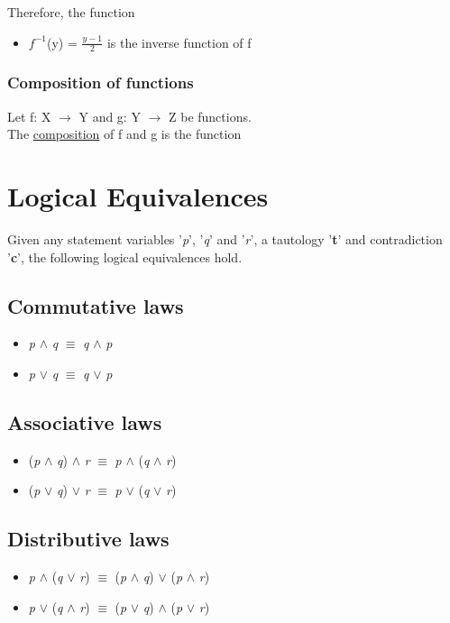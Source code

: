 \documentclass{article}
\begin{document}
Therefore, the function
\begin{itemize}
\item $f^{-1}$(y) = $\frac{y-1}{2}$ is the inverse function of f
\end{itemize}

\subsubsection{Composition of functions}

Let f: X $\longrightarrow$ Y and g: Y $\longrightarrow$ Z be functions. \\

The \underline{composition} of f and g is the function

\section{Logical Equivalences}

Given any statement variables '\textit{p}', '\textit{q}' and '\textit{r}', a tautology '\textbf{t}' and contradiction '\textbf{c}', the following
logical equivalences hold.


\subsection{Commutative laws}
\begin{itemize} 
\item \textit{p} $\wedge$ \textit{q} $\equiv$ \textit{q} $\wedge$ \textit{p}
\item \textit{p} $\lor$ \textit{q} $\equiv$ \textit{q} $\lor$ \textit{p}
\end{itemize}

\subsection{Associative laws}
\begin{itemize}
\item (\textit{p} $\wedge$ \textit{q}) $\wedge$ \textit{r} $\equiv$ \textit{p} $\wedge$ (\textit{q} $\wedge$ \textit{r})
\item (\textit{p} $\lor$ \textit{q}) $\lor$ \textit{r} $\equiv$ \textit{p} $\lor$ (\textit{q} $\lor$ \textit{r})
\end{itemize}

\subsection{Distributive laws}
\begin{itemize}
\item \textit{p} $\wedge$ (\textit{q} $\lor$ \textit{r}) $\equiv$ (\textit{p} $\wedge$ \textit{q}) $\lor$ (\textit{p} $\wedge$ \textit{r})
\item \textit{p} $\lor$ (\textit{q} $\wedge$ \textit{r}) $\equiv$ (\textit{p} $\lor$ \textit{q}) $\wedge$ (\textit{p} $\lor$ \textit{r})
\end{itemize}
\end{document}
